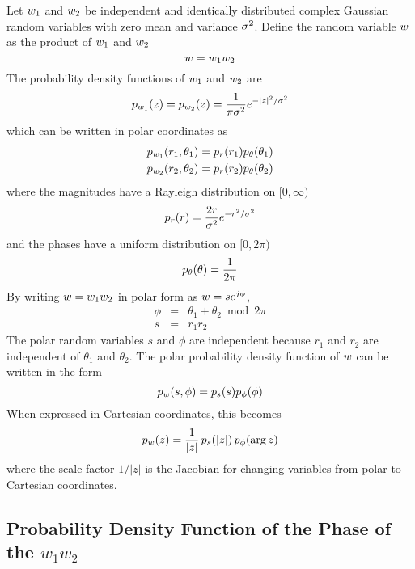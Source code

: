 Let ${w_1}$ and ${w_2}$ be independent and identically distributed complex
Gaussian random variables with zero mean and variance ${\sigma^2}$.  Define the 
random variable ${w}$ as the product of ${w_1}$ and ${w_2}$
\begin{equation}
{w}={w_1}{w_2}
\end{equation}
The probability density functions of ${w_1}$ and ${w_2}$ are 
\begin{equation}
{p}_{{w_1}}(z)={p}_{{w_2}}(z)=\frac{1}{\pi{\sigma^2}}{e^{-|z|^2/{\sigma^2}}}
\end{equation}
which can be written in polar coordinates as
\begin{eqnarray}
{p}_{{w_1}}(r_1,\theta_1)={p}_r(r_1){p}_{\theta}(\theta_1) \\
{p}_{{w_2}}(r_2,\theta_2)={p}_r(r_2){p}_{\theta}(\theta_2) 
\end{eqnarray}
where the magnitudes have a Rayleigh distribution on $[0,\infty)$
\begin{equation}
{p}_r(r)=\frac{2r}{{\sigma^2}}{e^{-r^2/{\sigma^2}}}
\end{equation}
and the phases have a uniform distribution on $[0,2\pi)$
\begin{equation}
{p}_{\theta}(\theta)=\frac{1}{2\pi}	
\end{equation}
By writing ${w}={w_1}{w_2}$ in polar form as ${w}=s{e^{j\phi}}$, 
\begin{eqnarray}
\phi&=&\theta_1+\theta_2 \bmod 2\pi\\
s&=&r_1r_2
\end{eqnarray}
The polar random variables $s$ and $\phi$ are independent because 
$r_1$ and $r_2$ are independent of $\theta_1$ and $\theta_2$.  The polar
probability density function of ${w}$ can be written in the form 
\begin{equation}
{p}_{{w}}(s,\phi)={p}_s(s){p}_{\phi}(\phi)
\end{equation}
When expressed in Cartesian coordinates, this becomes
\begin{equation}
{p}_{{w}}(z)=\frac{1}{|z|}\,{p}_s(|z|)\,{p}_{\phi}(\arg z)
\end{equation}
where the scale factor $1/|z|$ is the Jacobian for changing variables from
polar to Cartesian coordinates.


\subsection{Probability Density Function of the Phase of the $w_1w_2$}

